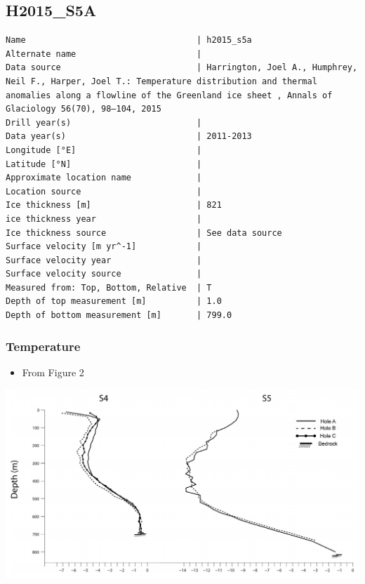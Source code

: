 \documentclass[article,a4paper,times,11pt,twoside]{article}
\begin{document}
\subsection{H2015\_S5A}
\label{sec:org0cde092}
\begin{verbatim}
Name                                  | h2015_s5a
Alternate name                        | 
Data source                           | Harrington, Joel A., Humphrey, Neil F., Harper, Joel T.: Temperature distribution and thermal anomalies along a flowline of the Greenland ice sheet , Annals of Glaciology 56(70), 98–104, 2015 
Drill year(s)                         | 
Data year(s)                          | 2011-2013
Longitude [°E]                        | 
Latitude [°N]                         | 
Approximate location name             | 
Location source                       | 
Ice thickness [m]                     | 821
ice thickness year                    | 
Ice thickness source                  | See data source
Surface velocity [m yr^-1]            | 
Surface velocity year                 | 
Surface velocity source               | 
Measured from: Top, Bottom, Relative  | T
Depth of top measurement [m]          | 1.0
Depth of bottom measurement [m]       | 799.0
\end{verbatim}

\subsubsection{Temperature}
\label{sec:org120ebf1}

\begin{itemize}
\item From \textcite{harrington_2015} Figure 2
\end{itemize}

\begin{center}
\includegraphics[width=.9\linewidth]{h2015_s5a/harrington_2015_fig2_S4_S5.png}
\end{center}
\end{document}
